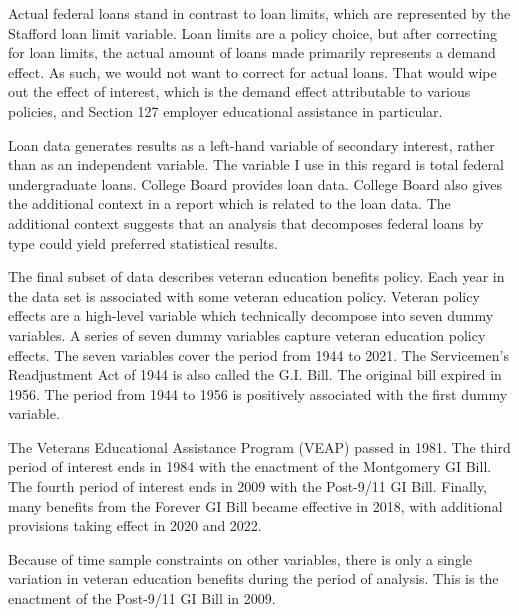 \documentclass[review]{elsarticle}
\begin{document}
Actual federal loans stand in contrast to loan limits, which are represented by the Stafford loan limit variable.
Loan limits are a policy choice, but after correcting for loan limits,
the actual amount of loans made primarily represents a demand effect.
As such, we would not want to correct for actual loans.
That would wipe out the effect of interest,
which is the demand effect attributable to various policies,
and Section 127 employer educational assistance in particular.

Loan data generates results as a left-hand variable of secondary interest, rather than as an independent variable.
The variable I use in this regard is total federal undergraduate loans.
College Board provides loan data.
College Board also gives the additional context in a report which is related to the loan data\cite{cb_excel_2019}.
The additional context suggests that an analysis that decomposes federal loans by type could yield preferred statistical results\cite{cb_trends_2019}.

The final subset of data describes veteran education benefits policy.
Each year in the data set is associated with some veteran education policy.
Veteran policy effects are a high-level variable which technically decompose into seven dummy variables.
A series of seven dummy variables capture veteran education policy effects.
The seven variables cover the period from 1944 to 2021.
The Servicemen's Readjustment Act of 1944 is also called the G.I. Bill.
The original bill expired in 1956\cite{glass_2010}.
The period from 1944 to 1956 is positively associated with the first dummy variable.

The Veterans Educational Assistance Program (VEAP) passed in 1981\cite{veteransaffairs_2017}.
The third period of interest ends in 1984 with the enactment of the Montgomery GI Bill\cite{powers_2018}.
The fourth period of interest ends in 2009 with the Post-9/11 GI Bill.
Finally, many benefits from the Forever GI Bill became effective in 2018,
with additional provisions taking effect in 2020 and 2022\cite{veteransaffairs_2020}.

Because of time sample constraints on other variables,
there is only a single variation in veteran education benefits during the period of analysis.
This is the enactment of the Post-9/11 GI Bill in 2009.
\end{document}
